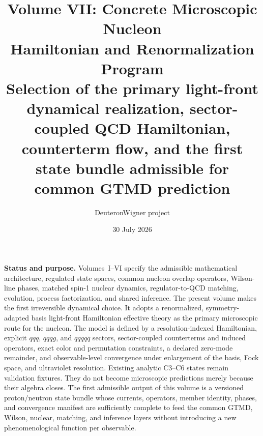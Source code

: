 \documentclass[11pt]{article}
\title{\vspace{-1.0cm}
{\color{navy}\bfseries Volume VII: Concrete Microscopic Nucleon\\[2mm]
Hamiltonian and Renormalization Program}\\[4mm]
\large Selection of the primary light-front dynamical realization, sector-coupled QCD Hamiltonian,\\
counterterm flow, and the first state bundle admissible for common GTMD prediction}
\author{DeuteronWigner project}
\date{30 July 2026}
\begin{document}
\maketitle

\begin{center}
\begin{minipage}{0.94\textwidth}
\colorbox{softblue}{\parbox{0.96\textwidth}{
\textbf{Status and purpose.}
Volumes~I--VI specify the admissible mathematical architecture, regulated
state spaces, common nucleon overlap operators, Wilson-line phases, matched
spin-1 nuclear dynamics, regulator-to-QCD matching, evolution, process
factorization, and shared inference.  The present volume makes the first
irreversible dynamical choice.  It adopts a renormalized,
symmetry-adapted basis light-front Hamiltonian effective theory as the primary
microscopic route for the nucleon.  The model is defined by a resolution-indexed
Hamiltonian, explicit \(qqq\), \(qqqg\), and \(qqqq\bar q\) sectors,
sector-coupled counterterms and induced operators, exact color and permutation
constraints, a declared zero-mode remainder, and observable-level convergence
under enlargement of the basis, Fock space, and ultraviolet resolution.
Existing analytic C3--C6 states remain validation fixtures.  They do not become
microscopic predictions merely because their algebra closes.  The first
admissible output of this volume is a versioned proton/neutron state bundle
whose currents, operators, member identity, phases, and convergence manifest
are sufficiently complete to feed the common GTMD, Wilson, nuclear, matching,
and inference layers without introducing a new phenomenological function per
observable.
}}
\end{minipage}
\end{center}
\end{document}
